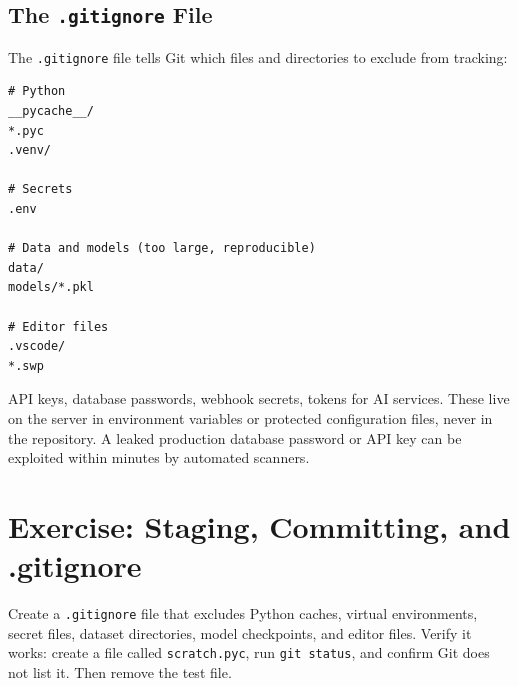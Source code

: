 
\subsection{The \texttt{.gitignore} File}

 The \texttt{.gitignore} file tells Git which files
and directories to exclude from tracking:

\begin{verbatim}
# Python
__pycache__/
*.pyc
.venv/

# Secrets
.env

# Data and models (too large, reproducible)
data/
models/*.pkl

# Editor files
.vscode/
*.swp
\end{verbatim}

 API keys, database passwords, webhook secrets,
tokens for AI services. These live on the server in environment variables or protected
configuration files, never in the repository.
A leaked production database password or API key can be exploited within minutes by automated scanners.


\newpage
\section{Exercise: Staging, Committing, and .gitignore}

 Create a \texttt{.gitignore} file that excludes
Python caches, virtual environments, secret files, dataset directories, model checkpoints, and editor files.
Verify it works: create a file called \texttt{scratch.pyc}, run \texttt{git status}, and confirm Git does not list it.
Then remove the test file.

